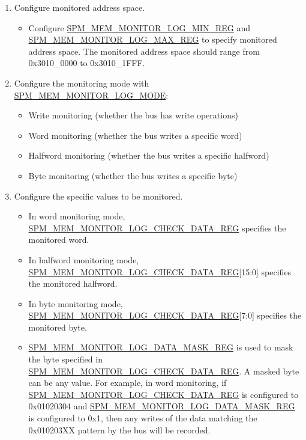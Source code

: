 \documentclass[main\_\_EN.tex]{subfiles}
\begin{document}
\begin{enumerate}

\item Configure monitored address space.
      \begin{itemize}
         \item Configure \hyperref[regdesc:SPMMEMMONITORLOGMINREG]{SPM\_MEM\_MONITOR\_LOG\_MIN\_REG} and \hyperref[regdesc:SPMMEMMONITORLOGMAXREG]{SPM\_MEM\_MONITOR\_LOG\_MAX\_REG} to specify monitored address space. The monitored address space should range from 0x3010\_0000 to 0x3010\_1FFF.
      \end{itemize}

\item Configure the monitoring mode with \hyperref[fielddesc:SPMMEMMONITORLOGMODE]{SPM\_MEM\_MONITOR\_LOG\_MODE}:
       \begin{itemize}
           \item Write monitoring (whether the bus has write operations)
           \item Word monitoring (whether the bus writes a specific word)
           \item Halfword monitoring (whether the bus writes a specific halfword)
           \item Byte monitoring (whether the bus writes a specific byte)
       \end{itemize}

\item Configure the specific values to be monitored.
       \begin{itemize}
            \item In word monitoring mode, \hyperref[regdesc:SPMMEMMONITORLOGCHECKDATAREG]{SPM\_MEM\_MONITOR\_LOG\_CHECK\_DATA\_REG} specifies the monitored word.
            \item In halfword monitoring mode, \hyperref[regdesc:SPMMEMMONITORLOGCHECKDATAREG]{SPM\_MEM\_MONITOR\_LOG\_CHECK\_DATA\_REG}[15:0] specifies the monitored halfword.
            \item In byte monitoring mode, \hyperref[regdesc:SPMMEMMONITORLOGCHECKDATAREG]{SPM\_MEM\_MONITOR\_LOG\_CHECK\_DATA\_REG}[7:0] specifies the monitored byte.
            \item \hyperref[regdesc:SPMMEMMONITORLOGDATAMASKREG]{SPM\_MEM\_MONITOR\_LOG\_DATA\_MASK\_REG} is used to mask the byte specified in \hyperref[regdesc:SPMMEMMONITORLOGCHECKDATAREG]{SPM\_MEM\_MONITOR\_LOG\_CHECK\_DATA\_REG}. A masked byte can be any value. For example, in word monitoring, if \hyperref[regdesc:SPMMEMMONITORLOGCHECKDATAREG]{SPM\_MEM\_MONITOR\_LOG\_CHECK\_DATA\_REG} is configured to 0x01020304 and \hyperref[regdesc:SPMMEMMONITORLOGDATAMASKREG]{SPM\_MEM\_MONITOR\_LOG\_DATA\_MASK\_REG} is configured to 0x1, then any writes of the data matching the 0x010203XX pattern by the bus will be recorded.
       \end{itemize}


\end{enumerate}
\end{document}
